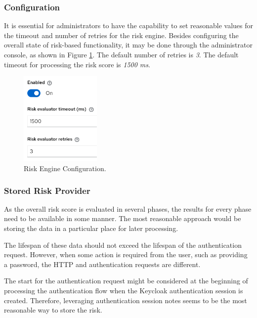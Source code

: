 \subsubsection{Configuration} \label{risk-engine-config}
It is essential for administrators to have the capability to set reasonable values for the timeout and number of retries for the risk engine.
Besides configuring the overall state of risk-based functionality, it may be done through the administrator console, as shown in Figure \ref{fig:risk-based-enging-config}.
The default number of retries is \textit{3}.
The default timeout for processing the risk score is \textit{1500 ms}.

\begin{figure}[htbp]
  \centering
  \includegraphics[width=0.35\textwidth]{img/sections/5-design/risk-based-engine-config.png}
  \caption{Risk Engine Configuration.}
  \label{fig:risk-based-enging-config}
\end{figure}

\subsubsection{Stored Risk Provider}
As the overall risk score is evaluated in several phases, the results for every phase need to be available in some manner. 
The most reasonable approach would be storing the data in a particular place for later processing.

The lifespan of these data should not exceed the lifespan of the authentication request.
However, when some action is required from the user, such as providing a password, the HTTP and authentication requests are different.

The start for the authentication request might be considered at the beginning of processing the authentication flow when the Keycloak authentication session is created.
Therefore, leveraging authentication session notes seems to be the most reasonable way to store the risk.

